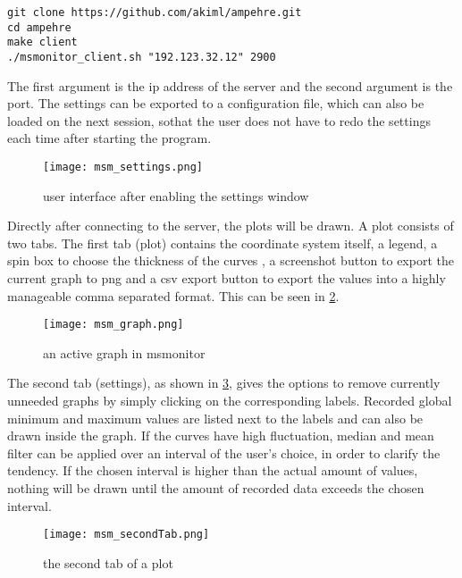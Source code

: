 \begin{lstlisting}[caption={install the client}, label=lst:msg4]
git clone https://github.com/akiml/ampehre.git
cd ampehre
make client
./msmonitor_client.sh "192.123.32.12" 2900
\end{lstlisting}
The first argument is the ip address of the server and the second argument is the port.\newline
The settings can be exported to a configuration file, which can also be loaded on the next session, sothat the user does not have to redo the settings each time after starting the program.
\begin{figure}[t!]
	\begin{center}
		\texttt{[image: msm\_settings.png]} 
		\caption{user interface after enabling the settings window}
		\label{fig:msm_settings}
	\end{center}
\end{figure}
Directly after connecting to the server, the plots will be drawn.\newline 
A plot consists of two tabs. The first tab (plot) contains the coordinate system itself, a legend, a spin box to choose the thickness of the curves , a screenshot button to export the current graph to png and a csv export button to export the values into a highly manageable comma separated format. This can be seen in \ref{fig:msm_graph}.
\begin{figure}[t!]
	\begin{center}
		\texttt{[image: msm\_graph.png]} 
		\caption{an active graph in msmonitor}
		\label{fig:msm_graph}
	\end{center}
\end{figure}
The second tab (settings), as shown in \ref{fig:msm_secondTab}, gives the options to remove currently unneeded graphs by simply clicking on the corresponding labels. Recorded global minimum and maximum values are listed next to the labels and can also be drawn inside the graph.\newline
If the curves have high fluctuation, median and mean filter can be applied over an interval of the user's choice, in order to clarify the tendency. If the chosen interval is higher than the actual amount of values, nothing will be drawn until the amount of recorded data exceeds the chosen interval.
\begin{figure}[t!]
	\begin{center}
		\texttt{[image: msm\_secondTab.png]} 
		\caption{the second tab of a plot}
		\label{fig:msm_secondTab}
	\end{center}
\end{figure}
